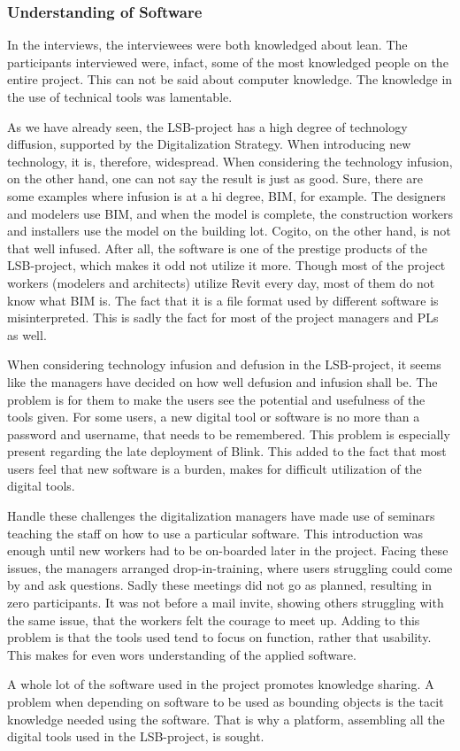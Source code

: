 \subsubsection{Understanding of Software}
In the interviews, the interviewees were both knowledged about lean. The participants interviewed were, infact, some of the most knowledged people on the entire project. This can not be said about computer knowledge. The knowledge in the use of technical tools was lamentable.

As we have already seen, the LSB-project has a high degree of technology diffusion, supported by the Digitalization Strategy. When introducing new technology, it is, therefore, widespread. When considering the technology infusion, on the other hand, one can not say the result is just as good. Sure, there are some examples where infusion is at a hi degree, BIM, for example. The designers and modelers use BIM, and when the model is complete, the construction workers and installers use the model on the building lot. Cogito, on the other hand, is not that well infused. After all, the software is one of the prestige products of the LSB-project, which makes it odd not utilize it more. Though most of the project workers (modelers and architects) utilize Revit every day, most of them do not know what BIM is. The fact that it is a file format used by different software is misinterpreted. This is sadly the fact for most of the project managers and PLs as well. 

When considering technology infusion and defusion in the LSB-project, it seems like the managers have decided on how well defusion and infusion shall be. The problem is for them to make the users see the potential and usefulness of the tools given. For some users, a new digital tool or software is no more than a password and username, that needs to be remembered. This problem is especially present regarding the late deployment of Blink. This added to the fact that most users feel that new software is a burden, makes for difficult utilization of the digital tools. 

Handle these challenges the digitalization managers have made use of seminars teaching the staff on how to use a particular software. This introduction was enough until new workers had to be on-boarded later in the project. Facing these issues, the managers arranged drop-in-training, where users struggling could come by and ask questions. Sadly these meetings did not go as planned, resulting in zero participants. It was not before a mail invite, showing others struggling with the same issue, that the workers felt the courage to meet up. Adding to this problem is that the tools used tend to focus on function, rather that usability. This makes for even wors understanding of the applied software.

A whole lot of the software used in the project promotes knowledge sharing. A problem when depending on software to be used as bounding objects is the tacit knowledge needed using the software. That is why a platform, assembling all the digital tools used in the LSB-project, is sought.

\cleardoublepage